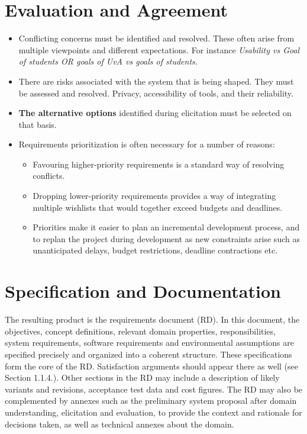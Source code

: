 \chapter{Evaluation and Agreement}
\begin{itemize}
	\item Conflicting concerns must be identified and resolved. These often arise from multiple
	viewpoints and different expectations. For instance \textit{Usability vs Goal of students OR goals of UvA vs goals of students.}
	\item There are risks associated with the system that is being shaped. They must be assessed
	and resolved. {Privacy, accessibility of tools, and their reliability.}
	\item \textbf{The alternative options} identified during elicitation must be selected on that basis. 
	\item Requirements prioritization is often necessary for a number of reasons: 
	\begin{itemize}
		\item Favouring higher-priority requirements is a standard way of resolving conflicts.
		\item Dropping lower-priority requirements provides a way of integrating multiple wishlists
		that would together exceed budgets and deadlines.
		\item Priorities make it easier to plan an incremental development process, and to replan
		the project during development as new constraints arise such as unanticipated delays,
		budget restrictions, deadline contractions etc.
	\end{itemize}
\end{itemize}

\chapter{Specification and Documentation}
The resulting product is the requirements document (RD). In this document, the objectives,
concept definitions, relevant domain properties, responsibilities, system requirements, software
requirements and environmental assumptions are specified precisely and organized into a
coherent structure. These specifications form the core of the RD. Satisfaction arguments should
appear there as well (see Section 1.1.4.). Other sections in the RD may include a description
of likely variants and revisions, acceptance test data and cost figures. The RD may also be
complemented by annexes such as the preliminary system proposal after domain understanding,
elicitation and evaluation, to provide the context and rationale for decisions taken, as well as
technical annexes about the domain. 

